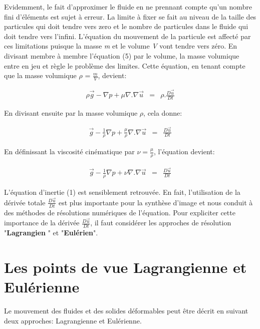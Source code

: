 \documentclass[11pt]{report}
\begin{document}
Evidemment, le fait d'approximer le fluide en ne prennant compte qu'un nombre fini d'éléments est sujet à erreur. La limite à fixer se fait au niveau de la taille des particules qui doit tendre vers zero et le nombre de particules dans le fluide qui doit tendre vers l'infini. L'équation du mouvement de la particule est affecté par ces limitations puisque la masse \textit{m} et le volume \textit{V} vont tendre vers zéro.
En divisant membre à membre l'équation (5) par le volume, la masse volumique entre en jeu et règle le problème des limites. Cette équation, en tenant compte que la masse volumique $ \rho $ = $ \frac{m}{V} $, devient:

\begin{eqnarray}
\rho\overrightarrow{g} - \nabla p + \mu \nabla . \nabla \overrightarrow{u} & = & \rho. \frac{D \overrightarrow{u}}{Dt}
\end{eqnarray}

En divisant ensuite par la masse volumique $ \rho $, cela donne:

\begin{eqnarray}
\overrightarrow{g} - \frac{1}{\rho}\nabla p + \frac{\mu}{\rho} \nabla . \nabla \overrightarrow{u} & = & \frac{D \overrightarrow{u}}{Dt}
\end{eqnarray}

En définissant la viscosité cinématique par $ \nu = \frac{\mu}{\rho} $, l'équation devient:

\begin{eqnarray}
\overrightarrow{g} - \frac{1}{\rho}\nabla p + \nu \nabla . \nabla \overrightarrow{u} & = & \frac{D \overrightarrow{u}}{Dt}
\end{eqnarray}

L'équation d'inertie (1) est sensiblement retrouvée. En fait, l'utilisation de la dérivée totale $ \frac{D\overrightarrow{u}}{Dt} $ est plus importante pour la synthèse d'image et nous conduit à des méthodes de résolutions numériques de l'équation. Pour expliciter cette importance de la dérivée $ \frac{D\overrightarrow{u}}{Dt} $, il faut considérer les approches de résolution "\textbf{Lagrangien} " et "\textbf{Eulérien}". 

\section{Les points de vue Lagrangienne et Eulérienne}

Le mouvement des fluides et des solides déformables peut être décrit en suivant deux approches: Lagrangienne et Eulérienne.\newline
\end{document}
